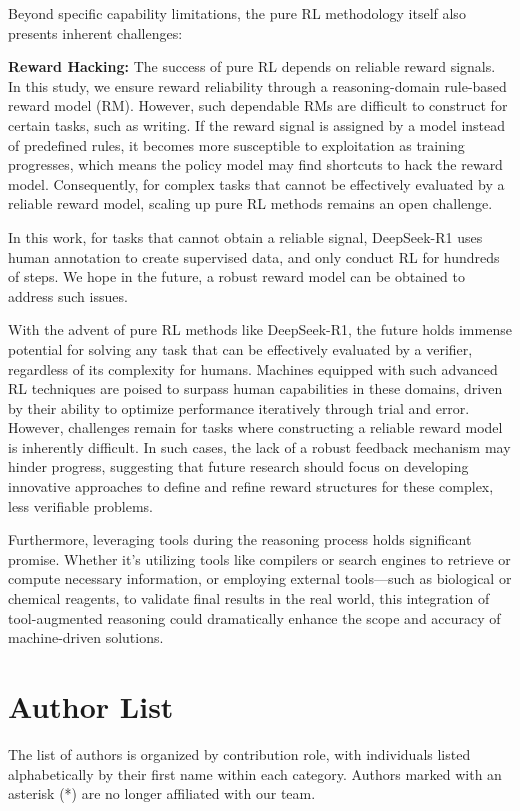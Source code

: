 Beyond specific capability limitations, the pure RL methodology itself also presents inherent challenges:

 \textbf{Reward Hacking:} The success of pure RL depends on reliable reward signals. In this study, we ensure reward reliability through a reasoning-domain rule-based reward model (RM). However, such dependable RMs are difficult to construct for certain tasks, such as writing. If the reward signal is assigned by a model instead of predefined rules, it becomes more susceptible to exploitation as training progresses, which means the policy model may find shortcuts to hack the reward model. Consequently, for complex tasks that cannot be effectively evaluated by a reliable reward model, scaling up pure RL methods remains an open challenge.

In this work, for tasks that cannot obtain a reliable signal, DeepSeek-R1 uses human annotation to create supervised data, and only conduct RL for hundreds of steps. We hope in the future, a robust reward model can be obtained to address such issues. 

With the advent of pure RL methods like DeepSeek-R1, the future holds immense potential for solving any task that can be effectively evaluated by a verifier, regardless of its complexity for humans. Machines equipped with such advanced RL techniques are poised to surpass human capabilities in these domains, driven by their ability to optimize performance iteratively through trial and error. However, challenges remain for tasks where constructing a reliable reward model is inherently difficult. In such cases, the lack of a robust feedback mechanism may hinder progress, suggesting that future research should focus on developing innovative approaches to define and refine reward structures for these complex, less verifiable problems.

 Furthermore, leveraging tools during the reasoning process holds significant promise. Whether it’s utilizing tools like compilers or search engines to retrieve or compute necessary information, or employing external tools—such as biological or chemical reagents, to validate final results in the real world, this integration of tool-augmented reasoning could dramatically enhance the scope and accuracy of machine-driven solutions.

\section{Author List} The list of authors is organized by contribution role, with individuals listed alphabetically by their first name within each category. Authors marked with an asterisk (*) are no longer affiliated with our team.

